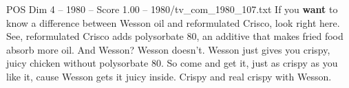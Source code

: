 \begin{textsample}{POS Dim 4 – 1980 – Score 1.00 – 1980/tv\_com\_1980\_107.txt}  \label{ex:f4_pos_061}
If you \textbf{want} to know a difference between Wesson oil and reformulated Crisco, look right here.
See, reformulated Crisco adds polysorbate 80, an additive that makes fried food absorb more oil.
And Wesson?
Wesson doesn't.
Wesson just gives you crispy, juicy chicken without polysorbate 80.
So come and get it, just as crispy as you like it, cause Wesson gets it juicy inside.
Crispy and real crispy with Wesson.

\end{textsample}
